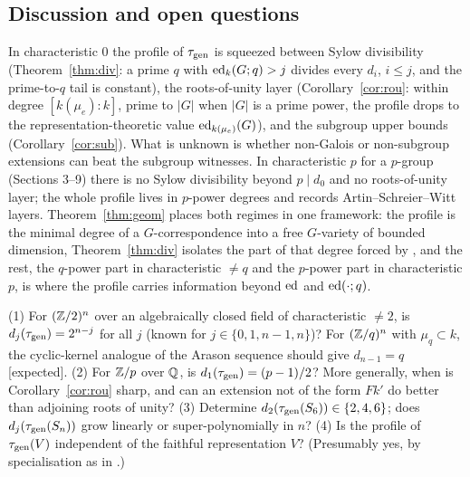 \subsection{Discussion and open questions}
In characteristic $0$ the profile of $\tau_{\mathrm{gen}}$ is squeezed between Sylow
divisibility (Theorem~\ref{thm:div}: a prime $q$ with $\operatorname{ed}_k(G;q)>j$ divides every
$d_i$, $i\le j$, and the prime-to-$q$ tail is constant), the roots-of-unity layer
(Corollary~\ref{cor:rou}: within degree $[k(\mu_e):k]$, prime to $|G|$ when $|G|$ is
a prime power, the profile drops to the representation-theoretic value
$\operatorname{ed}_{k(\mu_e)}(G)$), and the subgroup upper bounds (Corollary~\ref{cor:sub}). What is
unknown is whether non-Galois or non-subgroup extensions can beat the subgroup
witnesses. In characteristic $p$ for a $p$-group (Sections 3--9) there is no Sylow
divisibility beyond $p\mid d_0$ and no roots-of-unity layer; the whole profile lives in
$p$-power degrees and records Artin--Schreier--Witt layers. Theorem~\ref{thm:geom}
places both regimes in one framework: the profile is the minimal degree of a
$G$-correspondence into a free $G$-variety of bounded dimension, Theorem~\ref{thm:div}
isolates the part of that degree forced by \cite[Thm.~10.1]{RS}, and the rest, the
$q$-power part in characteristic $\ne q$ and the $p$-power part in characteristic $p$,
is where the profile carries information beyond $\operatorname{ed}$ and $\operatorname{ed}(\cdot;q)$.

\begin{question}
(1) For $(\mathbb Z/2)^n$ over an algebraically closed field of characteristic $\ne2$, is
$d_j(\tau_{\mathrm{gen}})=2^{n-j}$ for all $j$ (known for $j\in\{0,1,n-1,n\}$)? For $(\mathbb Z/q)^n$
with $\mu_q\subset k$, the cyclic-kernel analogue of the Arason sequence should give
$d_{n-1}=q$ [expected].
(2) For $\mathbb Z/p$ over $\mathbb Q$, is $d_1(\tau_{\mathrm{gen}})=(p-1)/2$? More generally, when is
Corollary~\ref{cor:rou} sharp, and can an extension not of the form $Fk'$ do better
than adjoining roots of unity?
(3) Determine $d_2(\tau_{\mathrm{gen}}(S_6))\in\{2,4,6\}$; does $d_j(\tau_{\mathrm{gen}}(S_n))$ grow
linearly or super-polynomially in $n$?
(4) Is the profile of $\tau_{\mathrm{gen}}(V)$ independent of the faithful representation $V$?
(Presumably yes, by specialisation as in \cite{RS}.)
\end{question}
